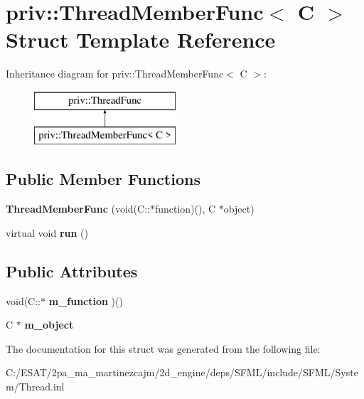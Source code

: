 \hypertarget{structpriv_1_1_thread_member_func}{}\section{priv\+:\+:Thread\+Member\+Func$<$ C $>$ Struct Template Reference}
\label{structpriv_1_1_thread_member_func}
Inheritance diagram for priv\+:\+:Thread\+Member\+Func$<$ C $>$\+:\begin{figure}[H]
\begin{center}
\leavevmode
\includegraphics[height=2.000000cm]{structpriv_1_1_thread_member_func}
\end{center}
\end{figure}
\subsection*{Public Member Functions}
\begin{DoxyCompactItemize}
\item 
\mbox{\label{structpriv_1_1_thread_member_func_ae44619c4cf6d886da6f32a1de37d652e}} 
{\bfseries Thread\+Member\+Func} (void(C\+::$\ast$function)(), C $\ast$object)
\item 
\mbox{\label{structpriv_1_1_thread_member_func_abbd440e93edf2747cf9cdde579bc5de0}} 
virtual void {\bfseries run} ()
\end{DoxyCompactItemize}
\subsection*{Public Attributes}
\begin{DoxyCompactItemize}
\item 
\mbox{\label{structpriv_1_1_thread_member_func_a2b3e753f87b70ae3ad1c4ff54a995fe8}} 
void(C\+::$\ast$ {\bfseries m\+\_\+function} )()
\item 
\mbox{\label{structpriv_1_1_thread_member_func_a849dd2e31c95e699fb316065d9d75116}} 
C $\ast$ {\bfseries m\+\_\+object}
\end{DoxyCompactItemize}


The documentation for this struct was generated from the following file\+:\begin{DoxyCompactItemize}
\item 
C\+:/\+E\+S\+A\+T/2pa\+\_\+ma\+\_\+martinezcajm/2d\+\_\+engine/deps/\+S\+F\+M\+L/include/\+S\+F\+M\+L/\+System/Thread.\+inl\end{DoxyCompactItemize}
